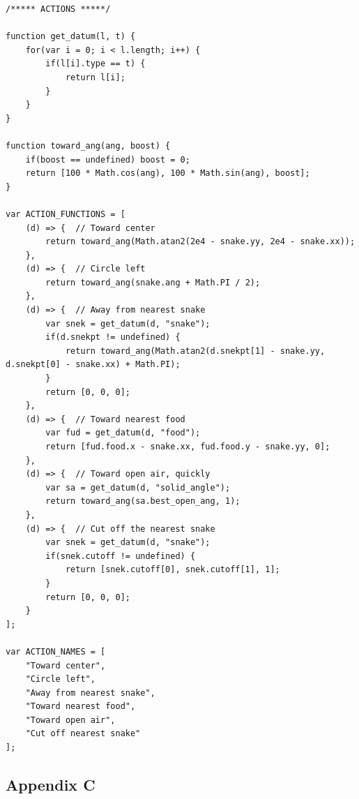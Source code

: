 \documentclass{article}
\begin{document}
	\begin{lstlisting}
/***** ACTIONS *****/

function get_datum(l, t) {
	for(var i = 0; i < l.length; i++) {
		if(l[i].type == t) {
			return l[i];
		}
	}
}

function toward_ang(ang, boost) {
	if(boost == undefined) boost = 0;
	return [100 * Math.cos(ang), 100 * Math.sin(ang), boost];
}

var ACTION_FUNCTIONS = [
	(d) => {  // Toward center
		return toward_ang(Math.atan2(2e4 - snake.yy, 2e4 - snake.xx));
	},
	(d) => {  // Circle left
		return toward_ang(snake.ang + Math.PI / 2);
	},
	(d) => {  // Away from nearest snake
		var snek = get_datum(d, "snake");
		if(d.snekpt != undefined) {
			return toward_ang(Math.atan2(d.snekpt[1] - snake.yy, d.snekpt[0] - snake.xx) + Math.PI);
		}
		return [0, 0, 0];
	},
	(d) => {  // Toward nearest food
		var fud = get_datum(d, "food");
		return [fud.food.x - snake.xx, fud.food.y - snake.yy, 0];
	},
	(d) => {  // Toward open air, quickly
		var sa = get_datum(d, "solid_angle");
		return toward_ang(sa.best_open_ang, 1);
	},
	(d) => {  // Cut off the nearest snake
		var snek = get_datum(d, "snake");
		if(snek.cutoff != undefined) {
			return [snek.cutoff[0], snek.cutoff[1], 1];
		}
		return [0, 0, 0];
	}
];

var ACTION_NAMES = [
	"Toward center",
	"Circle left",
	"Away from nearest snake",
	"Toward nearest food",
	"Toward open air",
	"Cut off nearest snake"
];
	\end{lstlisting}

\subsection{Appendix C}
\end{document}
